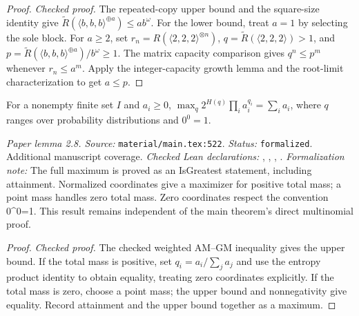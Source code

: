 \begin{proof}
\leanok
{}
\textit{Checked proof.} The repeated-copy upper bound and the square-size identity give $\widetilde R(\langle b,b,b\rangle^{\oplus a})\le ab^\omega$. For the lower bound, treat $a=1$ by selecting the sole block. For $a\ge2$, set $r_n=R(\langle2,2,2\rangle^{\otimes n})$, $q=\widetilde R(\langle2,2,2\rangle)>1$, and $p=\widetilde R(\langle b,b,b\rangle^{\oplus a})/b^\omega\ge1$. The matrix capacity comparison gives $q^n\le p^m$ whenever $r_n\le a^m$. Apply the integer-capacity growth lemma and the root-limit characterization to get $a\le p$.
\end{proof}

\renewcommand{\thetheorem}{2.8}
\begin{lemma}
\label{lem:optimize-sum}
\leanok
For a nonempty finite set $I$ and $a_i\ge0$, $\max_q 2^{H(q)}\prod_i a_i^{q_i}=\sum_i a_i$, where $q$ ranges over probability distributions and $0^0=1$.
\end{lemma}

\noindent\textit{Paper lemma 2.8. Source:} \texttt{material/main.tex:522}.
\textit{Status:} \texttt{formalized}. Additional manuscript coverage.
\textit{Checked Lean declarations:} , , , .
\textit{Formalization note:} The full maximum is proved as an IsGreatest statement, including attainment. Normalized coordinates give a maximizer for positive total mass; a point mass handles zero total mass. Zero coordinates respect the convention 0\textasciicircum{}0=1. This result remains independent of the main theorem's direct multinomial proof.

\begin{proof}
\leanok
{}
\textit{Checked proof.} The checked weighted AM--GM inequality gives the upper bound. If the total mass is positive, set $q_i=a_i/\sum_j a_j$ and use the entropy product identity to obtain equality, treating zero coordinates explicitly. If the total mass is zero, choose a point mass; the upper bound and nonnegativity give equality. Record attainment and the upper bound together as a maximum.
\end{proof}

